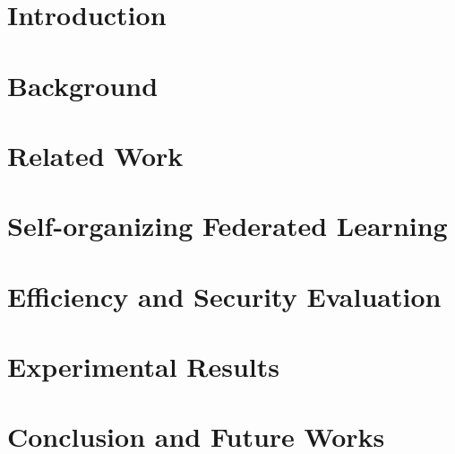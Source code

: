 \documentclass[journal]{IEEEtran}
\begin{document}
\section{Introduction} 
\label{sec:intro}


\section{Background}
\label{sec:back}


\section{Related Work}
\label{sec:related}


\section{Self-organizing Federated Learning}
\label{sec:sofl}


\section{Efficiency and Security Evaluation}
\label{sec:eval}


\section{Experimental Results}
\label{sec:exp}


\section{Conclusion and Future Works}
\label{sec:conc}





\end{document}
